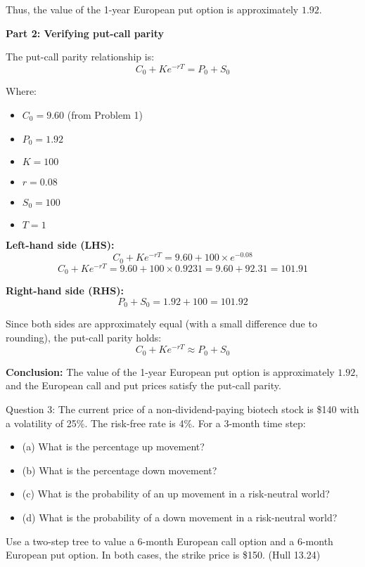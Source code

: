 \documentclass[12pt,letterpaper, onecolumn]{exam}
\begin{document}
\begin{solution}
Thus, the value of the 1-year European put option is approximately \( \boxed{1.92} \).

\textbf{Part 2: Verifying put-call parity}

The put-call parity relationship is:
\[
C_0 + K e^{-rT} = P_0 + S_0
\]

Where:
\begin{itemize}
    \item \( C_0 = 9.60 \) (from Problem 1)
    \item \( P_0 = 1.92 \)
    \item \( K = 100 \)
    \item \( r = 0.08 \)
    \item \( S_0 = 100 \)
    \item \( T = 1 \)
\end{itemize}

\textbf{Left-hand side (LHS):}
\[
C_0 + K e^{-rT} = 9.60 + 100 \times e^{-0.08}
\]
\[
C_0 + K e^{-rT} = 9.60 + 100 \times 0.9231 = 9.60 + 92.31 = 101.91
\]

\textbf{Right-hand side (RHS):}
\[
P_0 + S_0 = 1.92 + 100 = 101.92
\]

Since both sides are approximately equal (with a small difference due to rounding), the put-call parity holds:
\[
C_0 + K e^{-rT} \approx P_0 + S_0
\]

\textbf{Conclusion:}
The value of the 1-year European put option is approximately \( \boxed{1.92} \), and the European call and put prices satisfy the put-call parity.
\end{solution}

\newpage
    
   \begin{question}{Question 3:}
The current price of a non-dividend-paying biotech stock is \$140 with a volatility of 25\%. The risk-free rate is 4\%. For a 3-month time step:
\begin{itemize}
    \item (a) What is the percentage up movement?
    \item (b) What is the percentage down movement?
    \item (c) What is the probability of an up movement in a risk-neutral world?
    \item (d) What is the probability of a down movement in a risk-neutral world?
\end{itemize}
Use a two-step tree to value a 6-month European call option and a 6-month European put option. In both cases, the strike price is \$150. (Hull 13.24)
\end{question}
\end{document}
